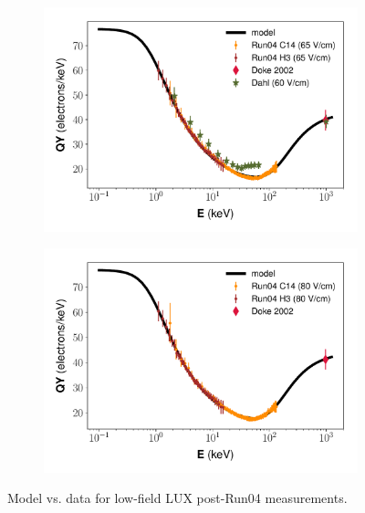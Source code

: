 \begin{figure}[!h]
\begin{subfigure}{0.5\linewidth}
\caption{}
\end{subfigure}
\begin{subfigure}{0.5\linewidth}
\includegraphics[width=\linewidth]{Figures/Yields_fit_new/NEST_fit_65Vcm_new.pdf}
\caption{}
\end{subfigure}%
\begin{subfigure}{0.5\linewidth}
\includegraphics[width=\linewidth]{Figures/Yields_fit_new/NEST_fit_80Vcm_new.pdf}
\caption{}
\end{subfigure}
\caption{Model vs. data for low-field LUX post-Run04 measurements.}
\label{fig:betamod_lowfield}
\end{figure}
